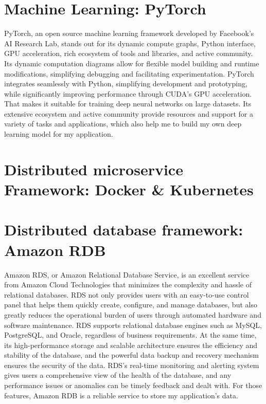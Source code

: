 \documentclass[12pt,two side]{report}
\begin{document}
\section{Machine Learning: PyTorch}
PyTorch, an open source machine learning framework developed by Facebook's AI Research Lab, stands out for its dynamic compute graphs, Python interface, GPU acceleration, rich ecosystem of tools and libraries, and active community. Its dynamic computation diagrams allow for flexible model building and runtime modifications, simplifying debugging and facilitating experimentation. PyTorch integrates seamlessly with Python, simplifying development and prototyping, while significantly improving performance through CUDA's GPU acceleration. That makes it suitable for training deep neural networks on large datasets. Its extensive ecosystem and active community provide resources and support for a variety of tasks and applications, which also help me to build my own deep learning model for my application.

\section{Distributed microservice Framework: Docker \& Kubernetes}
\section{Distributed database framework: Amazon RDB}
Amazon RDS, or Amazon Relational Database Service, is an excellent service from Amazon Cloud Technologies that minimizes the complexity and hassle of relational databases. RDS not only provides users with an easy-to-use control panel that helps them quickly create, configure, and manage databases, but also greatly reduces the operational burden of users through automated hardware and software maintenance. RDS supports relational database engines such as MySQL, PostgreSQL, and Oracle, regardless of business requirements. At the same time, its high-performance storage and scalable architecture ensures the efficiency and stability of the database, and the powerful data backup and recovery mechanism ensures the security of the data. RDS's real-time monitoring and alerting system gives users a comprehensive view of the health of the database, and any performance issues or anomalies can be timely feedback and dealt with. For those features, Amazon RDB is a reliable service to store my application's data. 
\end{document}
